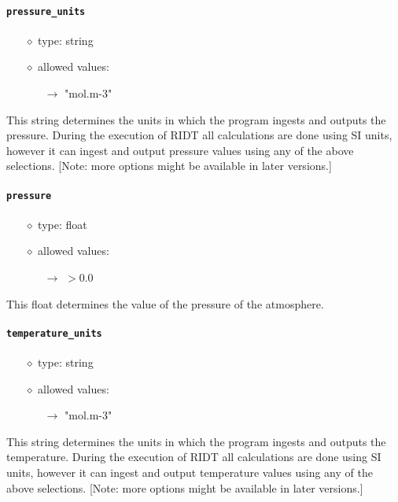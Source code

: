 \documentclass[]{article}
\def\code#1{\texttt{#1}}
\begin{document}
\paragraph{\code{pressure\_units}}\label{sec:pressureunits}
\begin{itemize}
    \item[$\diamond$] type: string 
    \item[$\diamond$] allowed values:
    \begin{itemize}
        \item[$\rightarrow$] "mol.m-3"
    \end{itemize}
\end{itemize}
This string determines the units in which the program ingests and outputs the
pressure. During the execution of RIDT all calculations are done using SI units,
however it can ingest and output pressure values using any of the above
selections. [Note: more options might be available in later versions.]

\paragraph{\code{pressure}}\label{sec:pressure}
\begin{itemize}
    \item[$\diamond$] type: float 
    \item[$\diamond$] allowed values:
    \begin{itemize}
        \item[$\rightarrow$] $>0.0$ 
    \end{itemize}
\end{itemize}
This float determines the value of the pressure of the atmosphere.

\paragraph{\code{temperature\_units}}\label{sec:temperatureunits}
\begin{itemize}
    \item[$\diamond$] type: string 
    \item[$\diamond$] allowed values:
    \begin{itemize}
        \item[$\rightarrow$] "mol.m-3"
    \end{itemize}
\end{itemize}
This string determines the units in which the program ingests and outputs the
temperature. During the execution of RIDT all calculations are done using SI units,
however it can ingest and output temperature values using any of the above
selections. [Note: more options might be available in later versions.]
\end{document}
